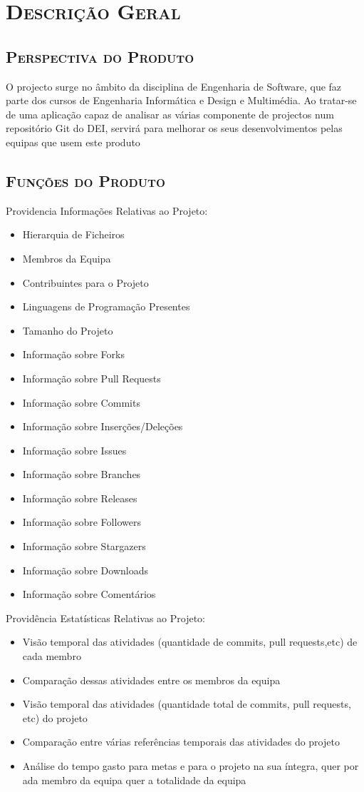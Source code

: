 \documentclass[12pt]{article}
\begin{document}
\pagebreak

\section{ \textsc{Descrição Geral}}
\subsection{ \textsc{Perspectiva do Produto}}
O projecto surge no âmbito da disciplina de Engenharia de Software, que faz parte dos cursos de Engenharia Informática e Design e Multimédia. Ao tratar-se de uma aplicação capaz de analisar as várias componente de projectos num repositório Git do DEI, servirá para melhorar os seus desenvolvimentos pelas equipas que usem este produto

\subsection{ \textsc{Funções do Produto}}
Providencia Informações Relativas ao Projeto:
\begin{itemize}
\item Hierarquia de Ficheiros
\item Membros da Equipa
\item Contribuintes para o Projeto
\item Linguagens de Programação Presentes
\item Tamanho do Projeto
\item Informação sobre Forks
\item Informação sobre Pull Requests
\item Informação sobre Commits
\item Informação sobre Inserções/Deleções
\item Informação sobre Issues
\item Informação sobre Branches
\item Informação sobre Releases
\item Informação sobre Followers
\item Informação sobre Stargazers
\item Informação sobre Downloads
\item Informação sobre Comentários
\end{itemize}

\pagebreak

Providência Estatísticas Relativas ao Projeto:
\begin{itemize}
\item Visão temporal das atividades (quantidade de commits, pull requests,etc) de cada membro
\item Comparação dessas atividades entre os membros da equipa
\item Visão temporal das atividades (quantidade total de commits, pull requests, etc) do projeto
\item Comparação entre várias referências temporais das atividades do projeto
\item Análise do tempo gasto para metas e para o projeto na sua íntegra,  quer por ada membro da equipa quer a totalidade da equipa
\end{itemize}
\end{document}
